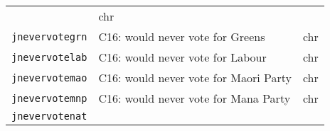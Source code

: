 \documentclass[]{article}
\begin{document}
\begin{longtable}[]{@{}lll@{}}
\begin{minipage}[t]{0.70\columnwidth}
\end{minipage} & \begin{minipage}[t]{0.08\columnwidth}\raggedright\strut
chr\strut
\end{minipage}\tabularnewline
\begin{minipage}[t]{0.14\columnwidth}\raggedright\strut
\texttt{jnevervotegrn}\strut
\end{minipage} & \begin{minipage}[t]{0.70\columnwidth}\raggedright\strut
C16: would never vote for Greens\strut
\end{minipage} & \begin{minipage}[t]{0.08\columnwidth}\raggedright\strut
chr\strut
\end{minipage}\tabularnewline
\begin{minipage}[t]{0.14\columnwidth}\raggedright\strut
\texttt{jnevervotelab}\strut
\end{minipage} & \begin{minipage}[t]{0.70\columnwidth}\raggedright\strut
C16: would never vote for Labour\strut
\end{minipage} & \begin{minipage}[t]{0.08\columnwidth}\raggedright\strut
chr\strut
\end{minipage}\tabularnewline
\begin{minipage}[t]{0.14\columnwidth}\raggedright\strut
\texttt{jnevervotemao}\strut
\end{minipage} & \begin{minipage}[t]{0.70\columnwidth}\raggedright\strut
C16: would never vote for Maori Party\strut
\end{minipage} & \begin{minipage}[t]{0.08\columnwidth}\raggedright\strut
chr\strut
\end{minipage}\tabularnewline
\begin{minipage}[t]{0.14\columnwidth}\raggedright\strut
\texttt{jnevervotemnp}\strut
\end{minipage} & \begin{minipage}[t]{0.70\columnwidth}\raggedright\strut
C16: would never vote for Mana Party\strut
\end{minipage} & \begin{minipage}[t]{0.08\columnwidth}\raggedright\strut
chr\strut
\end{minipage}\tabularnewline
\begin{minipage}[t]{0.14\columnwidth}\raggedright\strut
\texttt{jnevervotenat}\strut
\end{minipage} & \begin{minipage}[t]{0.70\columnwidth}\raggedright\strut

\end{minipage}
\end{longtable}
\end{document}
